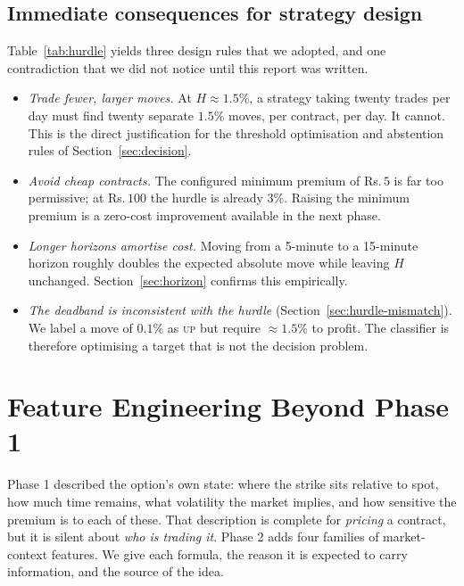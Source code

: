 \documentclass[11pt,a4paper]{article}
\newcommand{\rs}{Rs.\,}                 %
\begin{document}
\subsection{Immediate consequences for strategy design}

Table~\ref{tab:hurdle} yields three design rules that we adopted, and one contradiction
that we did not notice until this report was written.

\begin{itemize}
  \item \emph{Trade fewer, larger moves.} At $H\approx1.5\%$, a strategy taking twenty
        trades per day must find twenty separate $1.5\%$ moves, per contract, per day.
        It cannot. This is the direct justification for the threshold optimisation and
        abstention rules of Section~\ref{sec:decision}.
  \item \emph{Avoid cheap contracts.} The configured minimum premium of \rs$5$ is far
        too permissive; at \rs$100$ the hurdle is already $3\%$. Raising the minimum
        premium is a zero-cost improvement available in the next phase.
  \item \emph{Longer horizons amortise cost.} Moving from a 5-minute to a 15-minute
        horizon roughly doubles the expected absolute move while leaving $H$ unchanged.
        Section~\ref{sec:horizon} confirms this empirically.
  \item \emph{The deadband is inconsistent with the hurdle}
        (Section~\ref{sec:hurdle-mismatch}). We label a move of $0.1\%$ as \textsc{up}
        but require $\approx1.5\%$ to profit. The classifier is therefore optimising a
        target that is not the decision problem.
\end{itemize}

\section{Feature Engineering Beyond Phase 1}\label{sec:features}

Phase 1 described the option's own state: where the strike sits relative to spot, how
much time remains, what volatility the market implies, and how sensitive the premium is
to each of these. That description is complete for \emph{pricing} a contract, but it is
silent about \emph{who is trading it}. Phase 2 adds four families of market-context
features. We give each formula, the reason it is expected to carry information, and the
source of the idea.
\end{document}

